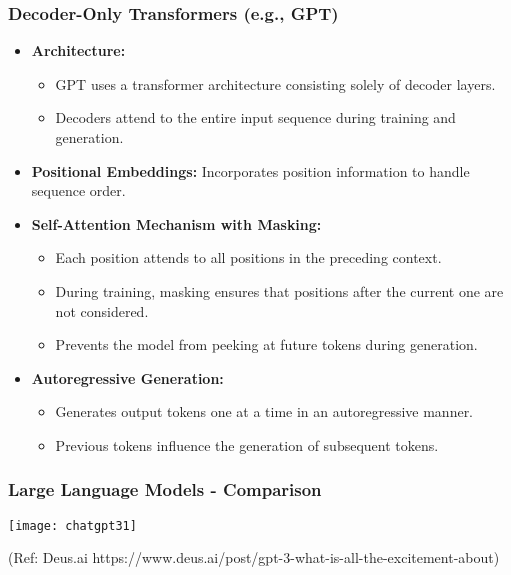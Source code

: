 \begin{frame}[fragile]\frametitle{Decoder-Only Transformers (e.g., GPT)}

  \begin{itemize}
    \item \textbf{Architecture:} 
      \begin{itemize}
        \item GPT uses a transformer architecture consisting solely of decoder layers.
        \item Decoders attend to the entire input sequence during training and generation.
      \end{itemize}

    \item \textbf{Positional Embeddings:} Incorporates position information to handle sequence order.

    \item \textbf{Self-Attention Mechanism with Masking:}
      \begin{itemize}
        \item Each position attends to all positions in the preceding context.
        \item During training, masking ensures that positions after the current one are not considered.
        \item Prevents the model from peeking at future tokens during generation.
      \end{itemize}

    \item \textbf{Autoregressive Generation:} 
      \begin{itemize}
        \item Generates output tokens one at a time in an autoregressive manner.
        \item Previous tokens influence the generation of subsequent tokens.
      \end{itemize}

  \end{itemize}

\end{frame}

\begin{frame}[fragile]\frametitle{Large Language Models - Comparison}

\begin{center}
\texttt{[image: chatgpt31]}
\end{center}				
{\tiny (Ref: Deus.ai https://www.deus.ai/post/gpt-3-what-is-all-the-excitement-about)}

\end{frame}


